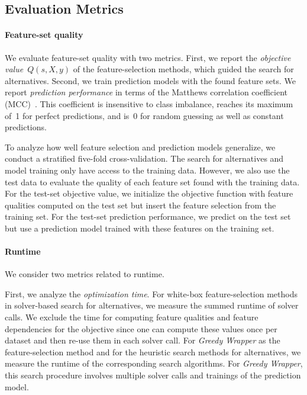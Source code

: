 \documentclass{article}
\theoremstyle{definition}
\begin{document}
\subsection{Evaluation Metrics}
\label{sec:afs:experimental-design:evaluation}

\paragraph{Feature-set quality}

We evaluate feature-set quality with two metrics.
First, we report the \emph{objective value}~$Q(s,X,y)$ of the feature-selection methods, which guided the search for alternatives.
Second, we train prediction models with the found feature sets.
We report \emph{prediction performance} in terms of the Matthews correlation coefficient (MCC)~\cite{matthews1975comparison}.
This coefficient is insensitive to class imbalance, reaches its maximum of~1 for perfect predictions, and is~0 for random guessing as well as constant predictions.

To analyze how well feature selection and prediction models generalize, we conduct a stratified five-fold cross-validation.
The search for alternatives and model training only have access to the training data.
However, we also use the test data to evaluate the quality of each feature set found with the training data.
For the test-set objective value, we initialize the objective function with feature qualities computed on the test set but insert the feature selection from the training set.
For the test-set prediction performance, we predict on the test set but use a prediction model trained with these features on the training set.

\paragraph{Runtime}

We consider two metrics related to runtime.

First, we analyze the \emph{optimization time}.
For white-box feature-selection methods in solver-based search for alternatives, we measure the summed runtime of solver calls.
We exclude the time for computing feature qualities and feature dependencies for the objective since one can compute these values once per dataset and then re-use them in each solver call.
For \emph{Greedy Wrapper} as the feature-selection method and for the heuristic search methods for alternatives, we measure the runtime of the corresponding search algorithms.
For \emph{Greedy Wrapper}, this search procedure involves multiple solver calls and trainings of the prediction model.
\end{document}
